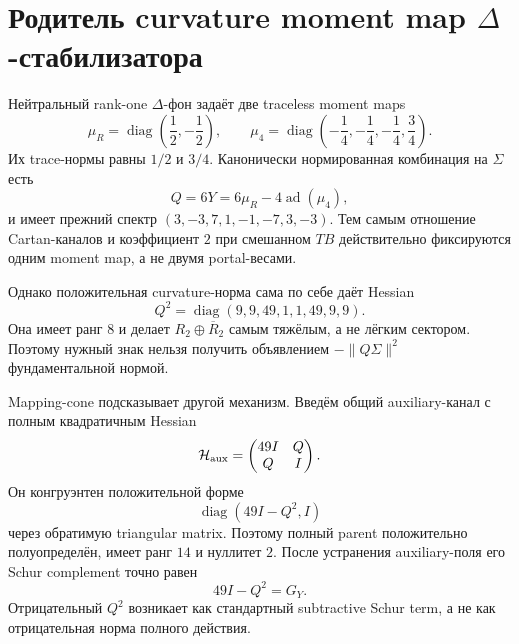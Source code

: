 \chapter{Родитель curvature moment map
\texorpdfstring{$\Delta$}{Delta}-стабилизатора}
\label{ch:v10-h15-r2-delta-moment-map-parent}

Нейтральный rank-one $\Delta$-фон задаёт две traceless moment maps
\begin{equation}
 \mu_R=\operatorname{diag}\left(\frac12,-\frac12\right),
 \qquad
 \mu_4=\operatorname{diag}\left(-\frac14,-\frac14,-\frac14,\frac34\right).
\end{equation}
Их trace-нормы равны $1/2$ и $3/4$. Канонически нормированная комбинация
на $\Sigma$ есть
\begin{equation}
 \boxed{Q=6Y=6\mu_R-4\operatorname{ad}(\mu_4)},
\end{equation}
и имеет прежний спектр $(3,-3,7,1,-1,-7,3,-3)$. Тем самым отношение
Cartan-каналов и коэффициент $2$ при смешанном $TB$ действительно
фиксируются одним moment map, а не двумя portal-весами.

Однако положительная curvature-норма сама по себе даёт Hessian
\begin{equation}
 Q^2=\operatorname{diag}(9,9,49,1,1,49,9,9).
\end{equation}
Она имеет ранг $8$ и делает $R_2\oplus\overline R_2$ самым тяжёлым, а не
лёгким сектором. Поэтому нужный знак нельзя получить объявлением
$-\|Q\Sigma\|^2$ фундаментальной нормой.

Mapping-cone подсказывает другой механизм. Введём общий auxiliary-канал с
полным квадратичным Hessian
\begin{equation}
 \mathcal H_{\rm aux}=
 \begin{pmatrix}
 49I&Q\\ Q&I
 \end{pmatrix}.
\end{equation}
Он конгруэнтен положительной форме
\begin{equation}
 \operatorname{diag}(49I-Q^2,I)
\end{equation}
через обратимую triangular matrix. Поэтому полный parent
положительно полуопределён, имеет ранг $14$ и нуллитет $2$. После
устранения auxiliary-поля его Schur complement точно равен
\begin{equation}
 \boxed{49I-Q^2=G_Y}.
\end{equation}
Отрицательный $Q^2$ возникает как стандартный subtractive Schur term, а не
как отрицательная норма полного действия.

